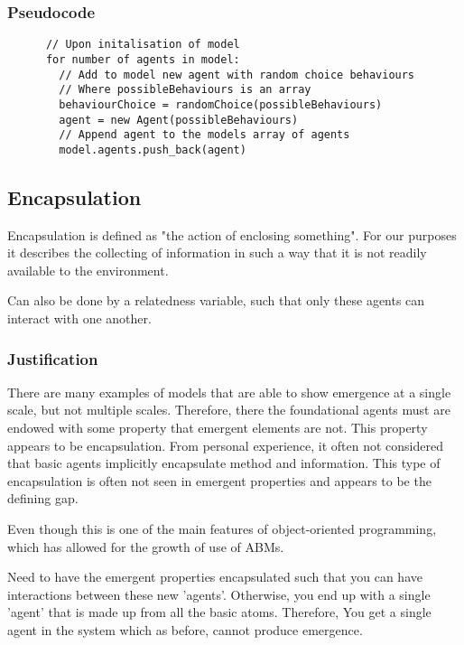 \documentclass{article}
\begin{document}
    \subsubsection{Pseudocode}
      
      \begin{verbatim}
      // Upon initalisation of model
      for number of agents in model:
        // Add to model new agent with random choice behaviours
        // Where possibleBehaviours is an array
        behaviourChoice = randomChoice(possibleBehaviours) 
        agent = new Agent(possibleBehaviours)
        // Append agent to the models array of agents
        model.agents.push_back(agent)
      \end{verbatim}


  \subsection{Encapsulation}
  \label{sec: encap}
      
    Encapsulation is defined as "the action of enclosing something". For our purposes it describes the collecting of information in such a way that it is not readily available to the environment.

    Can also be done by a relatedness variable, such that only these agents can interact with one another.

    \subsubsection{Justification}
      There are many examples of models that are able to show emergence at a single scale, but not multiple scales. Therefore, there the foundational agents must are endowed with some property that emergent elements are not. This property appears to be encapsulation. From personal experience, it often not considered that basic agents implicitly encapsulate method and information. This type of encapsulation is often not seen in emergent properties and appears to be the defining gap.

      Even though this is one of the main features of object-oriented programming, which has allowed for the growth of use of ABMs. 

        Need to have the emergent properties encapsulated such that you can have interactions between these new 'agents'. Otherwise, you end up with a single 'agent' that is made up from all the basic atoms. Therefore, You get a single agent in the system which as before, cannot produce emergence. 
\end{document}

